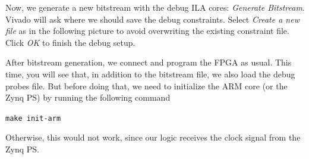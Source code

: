 \documentclass[11pt]{article}
\begin{document}
\begin{appendices}
\begin{center}
\end{center}
Now, we generate a new bitstream with the debug ILA cores: \emph{Generate Bitstream}. Vivado will ask where we should save the debug constraints. Select \emph{Create a new file} as in the following picture to avoid overwriting the existing constraint file. Click \emph{OK} to finish the debug setup. 

\begin{center}
\end{center}

After bitstream generation, we connect and program the FPGA as usual. This time, you will see that, in addition to the bitstream file, we also load the debug probes file. But before doing that, we need to initialize the ARM core (or the Zynq PS) by running the following command

\texttt{make init-arm}

Otherwise, this would not work, since our logic receives the clock signal from the Zynq PS.


\end{appendices}
\end{document}
